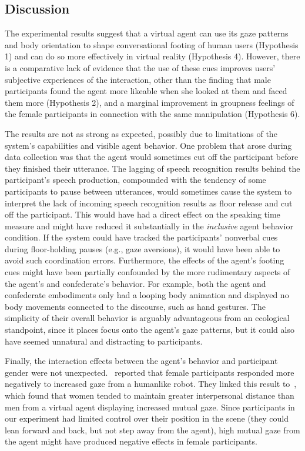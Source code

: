 \subsection{Discussion}

The experimental results suggest that a virtual agent can use its gaze patterns and body orientation to shape conversational footing of human users (Hypothesis 1) and can do so more effectively in virtual reality (Hypothesis 4). However, there is a comparative lack of evidence that the use of these cues improves users' subjective experiences of the interaction, other than the finding that male participants found the agent more likeable when she looked at them and faced them more (Hypothesis 2), and a marginal improvement in groupness feelings of the female participants in connection with the same manipulation (Hypothesis 6).

The results are not as strong as expected, possibly due to limitations of the system's capabilities and visible agent behavior. One problem that arose during data collection was that the agent would sometimes cut off the participant before they finished their utterance. The lagging of speech recognition results behind the participant's speech production, compounded with the tendency of some participants to pause between utterances, would sometimes cause the system to interpret the lack of incoming speech recognition results as floor release and cut off the participant. This would have had a direct effect on the speaking time measure and might have reduced it substantially in the \emph{inclusive} agent behavior condition.
If the system could have tracked the participants' nonverbal cues during floor-holding pauses (e.g., gaze aversions), it would have been able to avoid such coordination errors.
Furthermore, the effects of the agent's footing cues might have been partially confounded by the more rudimentary aspects of the agent's and confederate's behavior. For example, both the agent and confederate embodiments only had a looping body animation and displayed no body movements connected to the discourse, such as hand gestures. The simplicity of their overall behavior is arguably advantageous from an ecological standpoint, since it places focus onto the agent's gaze patterns, but it could also have seemed unnatural and distracting to participants.

Finally, the interaction effects between the agent's behavior and participant gender were not unexpected.~\citet{mutlu2006storytelling} reported that female participants responded more negatively to increased gaze from a humanlike robot. They linked this result to~\citep{bailenson2001equilibrium}, which found that women tended to maintain greater interpersonal distance than men from a virtual agent displaying increased mutual gaze. Since participants in our experiment had limited control over their position in the scene (they could lean forward and back, but not step away from the agent), high mutual gaze from the agent might have produced negative effects in female participants.
